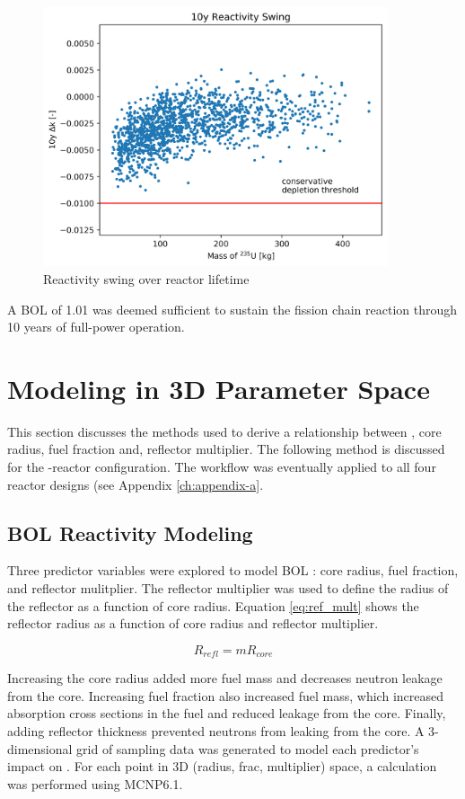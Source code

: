 \begin{figure}[h]
    \centering
    \includegraphics[width=4in]{../images/dK_vs_mass.png}
\caption{Reactivity swing over reactor lifetime}
\label{fig:delta_k_eol}
\end{figure}

A BOL \keff of 1.01 was deemed sufficient to sustain the fission chain reaction
through 10 years of full-power operation.

\section{Modeling \keff in 3D Parameter Space}\label{sec:crit_model}
This section discusses the methods used to derive a relationship between \keff,
core radius, fuel fraction and, reflector multiplier. The following method 
is discussed for the \uox-\codiox reactor configuration. The workflow was 
eventually applied to all four reactor designs (see Appendix \ref{ch:appendix-a}.

\subsection{BOL Reactivity Modeling}
Three predictor variables were explored to model BOL \keff: core radius,
fuel fraction, and reflector mulitplier. The reflector multiplier was used to
define the radius of the reflector as a function of core radius. Equation
\ref{eq:ref_mult} shows the reflector radius as a function of core radius and
reflector multiplier.

\begin{equation}
    \label{eq:ref_mult}
    R_{refl} = mR_{core}
\end{equation}

Increasing the core radius added more fuel mass and decreases neutron leakage 
from the core. Increasing fuel fraction also increased fuel mass, which
increased absorption cross sections in the fuel and reduced leakage from the core.
Finally, adding reflector thickness prevented neutrons from leaking from the
core. A 3-dimensional grid of sampling data was generated to model each
predictor's impact on \keff. For each point in 3D (radius, frac, multiplier) 
space, a \keff calculation was performed using MCNP6.1.

